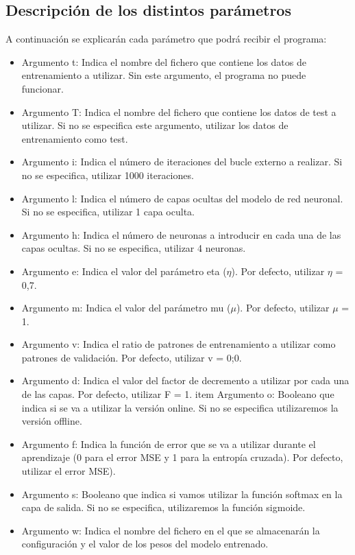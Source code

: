 \subsection{Descripción de los distintos parámetros}
A continuación se explicarán cada parámetro que podrá recibir el programa:
\begin{itemize}
\item Argumento t: Indica el nombre del fichero que contiene los datos de entrenamiento a utilizar. Sin este argumento, el programa no puede funcionar.
\item Argumento T: Indica el nombre del fichero que contiene los datos de test a utilizar. Si no se especifica este argumento, utilizar los datos de entrenamiento como test.
\item Argumento i: Indica el número de iteraciones del bucle externo a  realizar. Si no se especifica, utilizar 1000 iteraciones.
\item Argumento l: Indica el número de capas ocultas del modelo de red neuronal. Si no se especifica, utilizar 1 capa oculta.
\item Argumento h: Indica el número de neuronas a introducir en cada una de las capas ocultas. Si no se especifica, utilizar 4 neuronas.
\item Argumento e: Indica el valor del parámetro eta ($\eta$). Por defecto, utilizar $\eta$ = 0,7.
\item Argumento m: Indica el valor del parámetro mu ($\mu$). Por defecto, utilizar $\mu$ = 1.
\item Argumento v: Indica el ratio de patrones de entrenamiento a utilizar como patrones de validación. Por defecto, utilizar v = 0;0.
\item Argumento d: Indica el valor del factor de decremento a utilizar por cada una de las capas. Por defecto, utilizar F = 1.
\/item Argumento o: Booleano que indica si se va a utilizar la versión online. Si no se especifica utilizaremos la versión offline.
\item Argumento f: Indica la función de error que se va a utilizar durante el aprendizaje (0 para el error MSE y 1 para la entropía cruzada). Por defecto, utilizar el error MSE).
\item Argumento s: Booleano que indica si vamos utilizar la función softmax en la capa de salida. Si no se especifica, utilizaremos la función sigmoide.
\item Argumento w: Indica el nombre del fichero en el que se almacenarán la configuración y el valor de los pesos del modelo entrenado.
\end{itemize}



